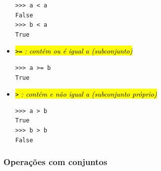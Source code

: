 \begin{itemize}
\begin{lstlisting}
>>> a < a
False
>>> b < a
True
\end{lstlisting}

\item \hl{{\lstinline+>=+} \emph{: contém ou é igual a (subconjunto)}}

\begin{lstlisting}
>>> a >= b
True
\end{lstlisting}

\item \hl{{\lstinline+>+} \emph{: contém e não igual a (subconjunto próprio)}}

\begin{lstlisting}
>>> a > b
True
>>> b > b
False
\end{lstlisting}
\end{itemize}

\subsubsection{Operações com conjuntos}

